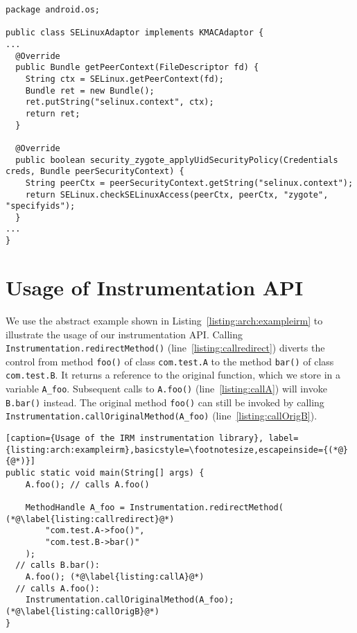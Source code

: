 \documentclass[letterpaper,twocolumn,10pt]{article}
\begin{document}
\begin{lstlisting}[basicstyle=\footnotesize, caption={Implementation of generic LSM interface for SELinux kernel module}, label={listing:arch:selinuxlsm},aboveskip=\medskipamount]
package android.os;

public class SELinuxAdaptor implements KMACAdaptor {
...
  @Override
  public Bundle getPeerContext(FileDescriptor fd) {
    String ctx = SELinux.getPeerContext(fd);
    Bundle ret = new Bundle();
    ret.putString("selinux.context", ctx);
    return ret;
  }

  @Override
  public boolean security_zygote_applyUidSecurityPolicy(Credentials creds, Bundle peerSecurityContext) {
    String peerCtx = peerSecurityContext.getString("selinux.context");
    return SELinux.checkSELinuxAccess(peerCtx, peerCtx, "zygote", "specifyids");
  }
...
}
\end{lstlisting}

\section{Usage of Instrumentation API}
\label{sec:appendix:irm}

We use the abstract example shown in Listing~\ref{listing:arch:exampleirm} to illustrate the usage of our instrumentation API. Calling \texttt{Instrumentation.redirectMethod()} (line~\ref{listing:callredirect}) diverts the control from method \texttt{foo()} of class \texttt{com.test.A} to the method \texttt{bar()} of class \texttt{com.test.B}. It returns a reference to the original function, which we store in a variable \texttt{A\_foo}. Subsequent calls to \texttt{A.foo()} (line~\ref{listing:callA}) will invoke \texttt{B.bar()} instead. The original method \texttt{foo()} can still be invoked by calling \texttt{Instrumentation.callOriginalMethod(A\_foo)} (line~\ref{listing:callOrigB}).


\begin{lstlisting}[caption={Usage of the IRM instrumentation library}, label={listing:arch:exampleirm},basicstyle=\footnotesize,escapeinside={(*@}{@*)}]
public static void main(String[] args) {
	A.foo(); // calls A.foo()

	MethodHandle A_foo = Instrumentation.redirectMethod( (*@\label{listing:callredirect}@*)
		"com.test.A->foo()",
		"com.test.B->bar()"
	);
  // calls B.bar():
	A.foo(); (*@\label{listing:callA}@*)
  // calls A.foo():
	Instrumentation.callOriginalMethod(A_foo); (*@\label{listing:callOrigB}@*)
}
\end{lstlisting}
\end{document}
